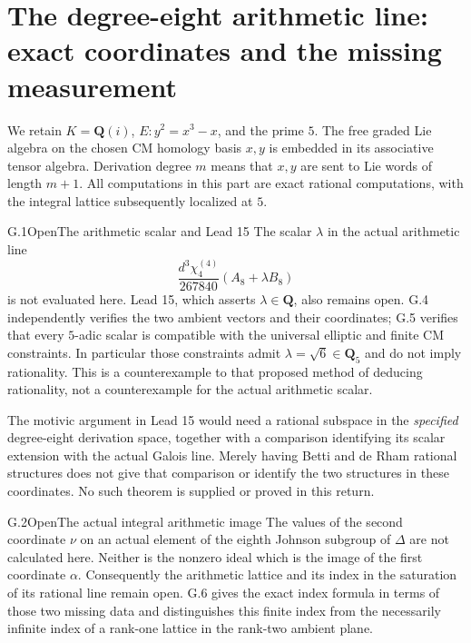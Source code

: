 \section{The degree-eight arithmetic line: exact coordinates and the missing measurement}

We retain $K=\mathbf Q(i)$, $E:y^2=x^3-x$, and the prime $5$.
The free graded Lie algebra on the chosen CM homology basis $x,y$
is embedded in its associative tensor algebra. Derivation degree $m$
means that $x,y$ are sent to Lie words of length $m+1$.
All computations in this part are exact rational computations, with
the integral lattice subsequently localized at $5$.

\begin{statement}{G.1}{Open}{The arithmetic scalar and Lead 15}
The scalar $\lambda$ in the actual arithmetic line
\[
 \frac{d^3\chi^{(4)}_4}{267840}(A_8+\lambda B_8)
\]
is not evaluated here. Lead 15, which asserts $\lambda\in\mathbf Q$,
also remains open. G.4 independently verifies the two ambient vectors
and their coordinates; G.5 verifies that every $5$-adic scalar is
compatible with the universal elliptic and finite CM constraints.
In particular those constraints admit $\lambda=\sqrt6\in\mathbf Q_5$
and do not imply rationality. This is a counterexample to that proposed
method of deducing rationality, not a counterexample for the actual
arithmetic scalar.

The motivic argument in Lead 15 would need a rational subspace in the
\emph{specified} degree-eight derivation space, together with a
comparison identifying its scalar extension with the actual Galois
line. Merely having Betti and de Rham rational structures does not
give that comparison or identify the two structures in these
coordinates. No such theorem is supplied or proved in this return.
\end{statement}

\begin{statement}{G.2}{Open}{The actual integral arithmetic image}
The values of the second coordinate $\nu$ on an actual element of
the eighth Johnson subgroup of $\Delta$ are not calculated here.
Neither is the nonzero ideal which is the image of the first
coordinate $\alpha$. Consequently the arithmetic lattice and its
index in the saturation of its rational line remain open. G.6 gives
the exact index formula in terms of those two missing data and
distinguishes this finite index from the necessarily infinite index
of a rank-one lattice in the rank-two ambient plane.
\end{statement}

